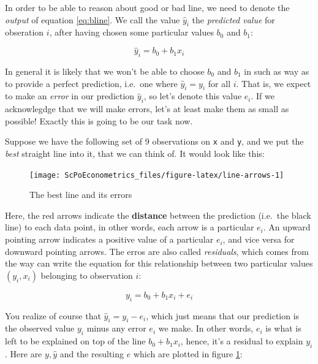 \documentclass[]{book}
\begin{document}
In order to be able to reason about good or bad line, we need to denote the \emph{output} of equation \eqref{eq:bline}. We call the value \(\hat{y}_i\) the \emph{predicted value} for obseration \(i\), after having chosen some particular values \(b_0\) and \(b_1\):

\begin{equation}
\hat{y}_i = b_0 + b_1 x_i \label{eq:abline-pred}
\end{equation}

In general it is likely that we won't be able to choose \(b_0\) and \(b_1\) in such as way as to provide a perfect prediction, i.e.~one where \(\hat{y}_i = y_i\) for all \(i\). That is, we expect to make an \emph{error} in our prediction \(\hat{y}_i\), so let's denote this value \(e_i\). If we acknowlegdge that we will make errors, let's at least make them as small as possible! Exactly this is going to be our task now.

Suppose we have the following set of 9 observations on \texttt{x} and \texttt{y}, and we put the \emph{best} straight line into it, that we can think of. It would look like this:

\begin{figure}

{\centering \texttt{[image: ScPoEconometrics\_files/figure-latex/line-arrows-1]} 

}

\caption{The best line and its errors}\label{fig:line-arrows}
\end{figure}

Here, the red arrows indicate the \textbf{distance} between the prediction (i.e.~the black line) to each data point, in other words, each arrow is a particular \(e_i\). An upward pointing arrow indicates a positive value of a particular \(e_i\), and vice versa for downward pointing arrows. The erros are also called \emph{residuals}, which comes from the way can write the equation for this relationship between two particular values \((y_i,x_i)\) belonging to observation \(i\):

\begin{equation}
y_i = b_0 + b_1 x_i + e_i \label{eq:abline}
\end{equation}

You realize of course that \(\hat{y}_i = y_i - e_i\), which just means that our prediction is the observed value \(y_i\) minus any error \(e_i\) we make. In other words, \(e_i\) is what is left to be explained on top of the line \(b_0 + b_1 x_i\), hence, it's a residual to explain \(y_i\). Here are \(y,\hat{y}\) and the resulting \(e\) which are plotted in figure \ref{fig:line-arrows}:
\end{document}
